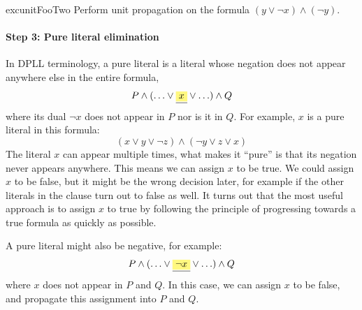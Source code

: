 \begin{restatable}{exc}{unitFooTwo}
Perform unit propagation on the formula $(y \vee \neg x)
\wedge (\neg y)$.
\end{restatable}

\paragraph{Step 3: Pure literal elimination}

In DPLL terminology, a pure literal is a literal whose
negation does not appear anywhere else in the entire formula, \eg{}
%
\begin{align*}
P \wedge (\ldots \vee \highlight{x} \vee \ldots) \wedge Q
\end{align*}
%
where its dual $\neg x$ does not appear in $P$ nor is it in $Q$.
For example, $x$ is a pure literal in this formula:
%
\begin{equation*}
(x \vee y \vee \neg z) \wedge (\neg y \vee z \vee x)
\end{equation*}
%
The literal $x$ can appear multiple times, what makes it ``pure'' is
that its negation never appears anywhere. This means we can assign $x$
to be true. We could assign $x$ to be false, but it might be the wrong
decision later, for example if the other literals in the clause turn
out to false as well. It turns out that the most useful approach is to
assign $x$ to true by following the principle of progressing towards
a true formula as quickly as possible.

A pure literal might also be negative, for example:
\begin{align*}
P \wedge (\ldots \vee \highlight{\neg x} \vee \ldots) \wedge Q
\end{align*}
where $x$ does not appear in $P$ and $Q$. In this case, we can assign
$x$ to be false, and propagate this assignment into $P$ and $Q$.

